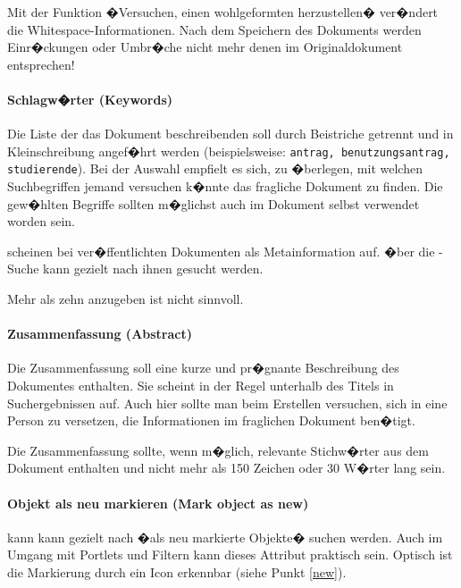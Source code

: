 \begin{Hinweis}
  Mit der Funktion �Versuchen, einen wohlgeformten 
  herzustellen� ver�ndert  die
  Whitespace-Informationen. Nach dem Speichern des Dokuments werden
  Einr�ckungen oder Umbr�che nicht mehr denen im Originaldokument
  entsprechen!
\end{Hinweis}

\paragraph{Schlagw�rter (Keywords)}
\label{keywords}

Die Liste der das Dokument beschreibenden 
soll durch Beistriche getrennt und in Kleinschreibung angef�hrt werden
(beispielsweise: \texttt{antrag, benutzungsantrag, studierende}). Bei
der Auswahl empfielt es sich, zu �berlegen, mit welchen Suchbegriffen
jemand versuchen k�nnte das fragliche Dokument zu finden. Die
gew�hlten Begriffe sollten m�glichst auch im Dokument selbst verwendet
worden sein.

 scheinen bei ver�ffentlichten Dokumenten
als Metainformation auf. �ber die -Suche kann gezielt
nach ihnen gesucht werden.

Mehr als zehn  anzugeben ist nicht sinnvoll.

\paragraph{Zusammenfassung (Abstract)}
\label{abstract}

Die Zusammenfassung soll eine kurze und pr�gnante Beschreibung des
Dokumentes enthalten. Sie scheint in der Regel unterhalb des Titels in
Suchergebnissen auf. Auch hier sollte man beim Erstellen versuchen,
sich in eine Person zu versetzen, die Informationen im fraglichen
Dokument ben�tigt.

Die Zusammenfassung sollte, wenn m�glich, relevante Stichw�rter aus
dem Dokument enthalten und nicht mehr als 150 Zeichen oder 30 W�rter
lang sein.

\paragraph{Objekt als neu markieren (Mark object as new)}
\label{markasnew}

 kann kann gezielt nach �als neu markierte Objekte�
suchen werden. Auch im Umgang mit Portlets und Filtern kann dieses
Attribut praktisch sein. Optisch ist die Markierung durch ein Icon
erkennbar (siehe Punkt \ref{new}).


